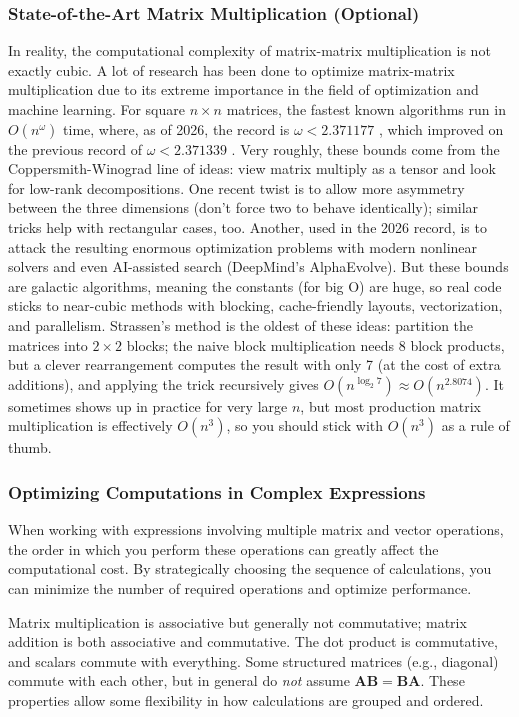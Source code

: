 \subsubsection*{State-of-the-Art Matrix Multiplication (Optional)}
In reality, the computational complexity of matrix-matrix multiplication is not exactly cubic. A lot of research has been done to optimize matrix-matrix multiplication due to its extreme importance in the field of optimization and machine learning. For square $n\times n$ matrices, the fastest known algorithms run in $O(n^{\omega})$ time, where, as of 2026, the record is $\omega < 2.371177$ \cite{dupont2026matmul}, which improved on the previous record of $\omega < 2.371339$ \cite{alman2024asymmetry}. Very roughly, these bounds come from the Coppersmith-Winograd line of ideas: view matrix multiply as a tensor and look for low-rank decompositions. One recent twist is to allow more asymmetry between the three dimensions (don't force two to behave identically); similar tricks help with rectangular cases, too. Another, used in the 2026 record, is to attack the resulting enormous optimization problems with modern nonlinear solvers and even AI-assisted search (DeepMind's AlphaEvolve). But these bounds are galactic algorithms, meaning the constants (for big O) are huge, so real code sticks to near-cubic methods with blocking, cache-friendly layouts, vectorization, and parallelism. Strassen's method is the oldest of these ideas: partition the matrices into $2 \times 2$ blocks; the naive block multiplication needs 8 block products, but a clever rearrangement computes the result with only 7 (at the cost of extra additions), and applying the trick recursively gives $O(n^{\log_2 7}) \approx O(n^{2.8074})$. It sometimes shows up in practice for very large $n$, but most production matrix multiplication is effectively $O(n^3)$, so you should stick with $O(n^3)$ as a rule of thumb.


\subsubsection*{Optimizing Computations in Complex Expressions}
When working with expressions involving multiple matrix and vector operations, the order in which you perform these operations can greatly affect the computational cost. By strategically choosing the sequence of calculations, you can minimize the number of required operations and optimize performance.

Matrix multiplication is associative but generally not commutative; matrix addition is both associative and commutative. The dot product is commutative, and scalars commute with everything. Some structured matrices (e.g., diagonal) commute with each other, but in general do \emph{not} assume $ \mathbf{A}\mathbf{B}=\mathbf{B}\mathbf{A} $. These properties allow some flexibility in how calculations are grouped and ordered.

